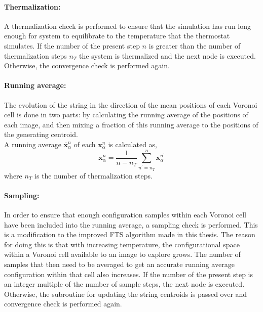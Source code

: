 \documentclass{article}
\begin{document}
\paragraph*{Thermalization:}

A thermalization check is performed to ensure that the simulation has run long enough for system to equilibrate to the temperature that the thermostat simulates. If the number of the present step $n$ is greater than the number of thermalization steps $n_T$ the system is thermalized and the next node is executed. Otherwise, the convergence check is performed again.

\paragraph*{Running average:}

The evolution of the string in the direction of the mean positions of each Voronoi cell is done in two parts: by calculating the running average of the positions of each image, and then mixing a fraction of this running average to the positions of the generating centroid. ~\\

\noindent A running average $\bm{\bar{x}}_{\alpha}^n$ of each $\bm{x}_{\alpha}^n$ is calculated as,
%
\begin{equation} \label{eq:24}
\bm{\bar{x}}_{\alpha}^n =  \dfrac{1}{n - n_T} \sum_{n^{\prime} = n_T}^{n} \bm{x}_{\alpha}^{n^{\prime}}
\end{equation}
%
where $n_T$ is the number of thermalization steps.

\paragraph*{Sampling:}

In order to ensure that enough configuration samples within each Voronoi cell have been included into the running average, a sampling check is performed. This is a modification to the improved FTS algorithm \cite{Vanden-Eijnden2009} made in this thesis. The reason for doing this is that with increasing temperature, the configurational space within a Voronoi cell available to an image to explore grows. The number of samples that then need to be averaged to get an accurate running average configuration within that cell also increases. If the number of the present step is an integer multiple of the number of sample steps, the next node is executed. Otherwise, the subroutine for updating the string centroids is passed over and convergence check is performed again.
\end{document}
